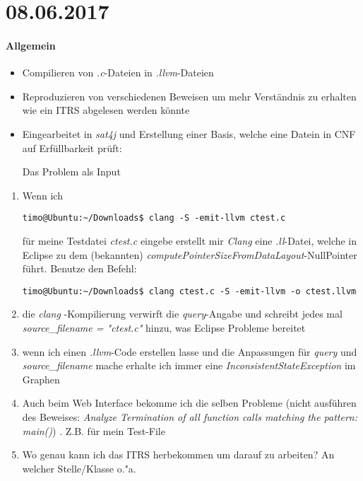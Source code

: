 \section*{08.06.2017}

\paragraph{Allgemein}
\begin{itemize}
	\item Compilieren von \emph{.c}-Dateien in \emph{.llvm}-Dateien
	\item Reproduzieren von verschiedenen Beweisen um mehr Verständnis zu erhalten wie ein ITRS abgelesen werden könnte
	\item Eingearbeitet in \emph{sat4j} und Erstellung einer Basis, welche eine Datein in CNF auf Erfüllbarkeit prüft: 
	
	Das Problem als Input
	
	
	
\end{itemize}

\begin{enumerate}
	\item Wenn ich 
		\lstset{autogobble=true}
		\begin{lstlisting}[style=BASH]
			timo@Ubuntu:~/Downloads$ clang -S -emit-llvm ctest.c
		\end{lstlisting}
		für meine Testdatei \emph{ctest.c} eingebe erstellt mir \emph{Clang} eine \emph{.ll}-Datei, welche in Eclipse zu dem (bekannten) \emph{computePointerSizeFromDataLayout}-NullPointer führt. \newline
		\answer Benutze den Befehl: 
		\begin{lstlisting}[style=BASH]
			timo@Ubuntu:~/Downloads$ clang ctest.c -S -emit-llvm -o ctest.llvm
		\end{lstlisting}
	\item die \emph{clang} -Kompilierung verwirft die \emph{query}-Angabe und schreibt jedes mal \emph{source\_filename = "ctest.c"} hinzu, was Eclipse Probleme bereitet
	\item wenn ich einen \emph{.llvm}-Code erstellen lasse und die Anpassungen für \emph{query} und \emph{source\_filename} mache erhalte ich immer eine \emph{InconsistentStateException} im Graphen 
	\item Auch beim Web Interface bekomme ich die selben Probleme (nicht ausführen des Beweises: \emph{Analyze Termination of all function calls matching the pattern: main()}) . Z.B. für mein Test-File
	\newpage
		\lstset{escapechar=@, style=customc,xleftmargin=.2\textwidth, xrightmargin=.2\textwidth, autogobble=true}
			
	\item Wo genau kann ich das ITRS herbekommen um darauf zu arbeiten? An welcher Stelle/Klasse o."a.
\end{enumerate}

